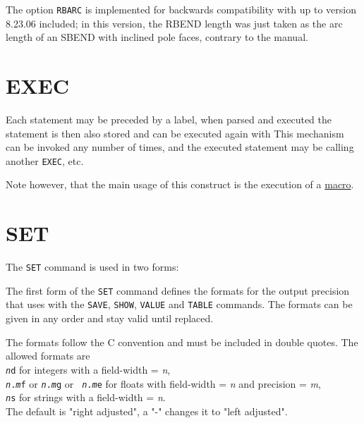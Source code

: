 The option {\tt RBARC} is implemented for backwards compatibility
with \madeight up to version 8.23.06 included; in this version, the
RBEND length was just taken as the arc length of an SBEND with inclined
pole faces, contrary to the \madeight manual.  




\section{EXEC}
\label{sec:exec}
Each statement may be preceded by a label, when parsed and executed the
statement is then also stored and can be executed again with
This mechanism can be invoked any number of times, and the executed
statement may be calling another {\tt EXEC}, etc. 

Note however, that the main usage of this \madx construct is the
execution of a \href{special.html#macro}{macro}.   



\section{SET}
\label{sec:set}
The {\tt SET} command is used in two forms:


The first form of the {\tt SET} command defines the formats for the
output precision that \madx uses with the {\tt SAVE}, {\tt SHOW},
{\tt VALUE} and {\tt TABLE} commands. The formats can be
given in any order and stay valid until replaced. 

The formats follow the C convention and must be included in double
quotes. The allowed formats are \\
{\tt {\it n}d} for integers with a field-width = {\it n}, \\
{\tt {\it n}.{\it m}f} or {\tt {\it n}.{\it m}g} or {\tt {\it
    n}.{\it m}e} for floats with field-width = {\it n} and precision =
       {\it m}, \\
{\tt {\it n}s} for strings with a field-width = {\it n}.\\
The default is "right adjusted", a "-" changes it to "left adjusted".

